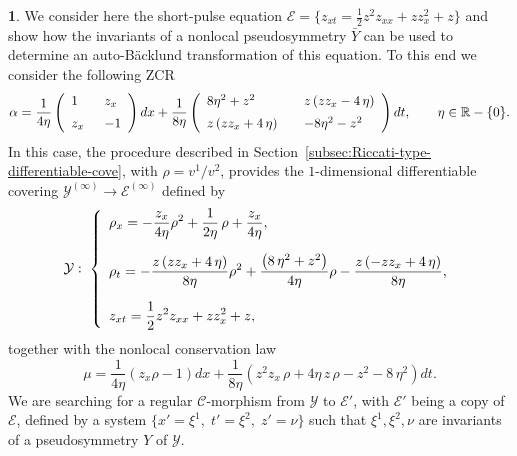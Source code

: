 \documentclass[12pt,english]{elsarticle}
\theoremstyle{plain}
\theoremstyle{plain}
\theoremstyle{remark}
\theoremstyle{plain}
\theoremstyle{definition}
\theoremstyle{definition}
\newtheorem{example}[thm]{\protect\examplename}
\providecommand{\examplename}{Example}
\begin{document}
\begin{example}
\label{exmp30}
We consider here the short-pulse equation
$\mathcal{E}=\{z_{xt}=\frac{1}{2}z^{2}z_{xx}+zz_{x}^{2}+z\}$ and show how
the invariants of a nonlocal pseudosymmetry $\bar{Y}$ can be used to determine
an auto-B\"{a}cklund transformation of this equation. To this end we consider
the following ZCR
%
\begin{equation*}
\alpha =\frac{1}{4\eta}\left (
%
\begin{array}{l@{\quad}l}
1\quad & z_{x}
\vspace{5pt}
\\
z_{x} & -1
\end{array}
%
\right )dx+\frac{1}{8\eta}\left (
%
\begin{array}{l@{\quad}l}
8\eta ^{2}+z^{2} & z\left (zz_{x}-4\,\eta \right )
\vspace{5pt}
\\
z\left (zz_{x}+4\,\eta \right )\quad & -8\eta ^{2}-z^{2}
\end{array}
%
\right )dt,\qquad \eta \in \mathbb{R}-\{0\}.
\end{equation*}
%
In this case, the procedure described in Section~\ref{subsec:Riccati-type-differentiable-cove}, with
$\rho =v^{1}/v^{2}$, provides the $1$-dimensional differentiable covering
$\mathcal{Y}^{(\infty )}\rightarrow \mathcal{E}^{(\infty )}$ defined by
%
\begin{equation*}
\mathcal{Y}:\;\left \{
%
\begin{array}{l}
{\displaystyle \rho _{x}=-\frac{z_{x}}{4\eta}\rho ^{2}+
\frac{1}{2\eta}\,\rho +\frac{z_{x}}{4\eta}},
\vspace{10pt}
\\
{\displaystyle \rho _{t}=-
\frac{z\left (zz_{x}+4\,\eta \right )}{8\eta}\rho ^{2}+
\frac{\left (8\,\eta ^{2}+z^{2}\right )}{4\eta}\rho -
\frac{z\left (-zz_{x}+4\,\eta \right )}{8\eta}},
\vspace{10pt}
\\
{\displaystyle z_{xt}=\frac{1}{2}z^{2}z_{xx}+zz_{x}^{2}+z,}
\end{array}
%
\right .
\end{equation*}
%
together with the nonlocal conservation law
%
\begin{equation*}
\mu =\frac{1}{4\eta}\left (z_{x}\rho -1\right )dx+\frac{1}{8\eta}
\left (z^{2}z_{x}\,\rho +4\eta \,z\,\rho -z^{2}-8\,\eta ^{2}\right )dt.
\end{equation*}
%
We are searching for a regular $\mathcal{C}$-morphism from
$\mathcal{Y}$ to $\mathcal{E}'$, with $\mathcal{E}'$ being a copy of
$\mathcal{E}$, defined by a system
$\{x'=\xi ^{1},\;t'=\xi ^{2},\;z'=\nu \}$ such that
$\xi ^{1},\xi ^{2},\nu $ are invariants of a pseudosymmetry $Y$ of
$\mathcal{Y}$.


\end{example}
\end{document}
